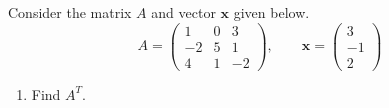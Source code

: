 \documentclass[12pt,letterpaper]{exam}
\begin{document}
\begin{questions}
\newpage
\question[15] Consider the matrix $A$ and vector $\mathbf{x}$ given below.
	\[
	A= \begin{pmatrix} 1 & 0 & 3 \\ -2 & 5 & 1 \\ 4 & 1 & -2 \end{pmatrix}, \qquad \mathbf{x}= \begin{pmatrix} 3 \\ -1 \\ 2 \end{pmatrix}
	\]

\begin{enumerate}
\item[(a)] Find $A^T$. \par\vspace{0.3cm}
\wsol{%
	\[
	A^T= \boxed{\begin{pmatrix} 1 & -2 & 4 \\ 0 & 5 & 1 \\ 3 & 1 & -2 \end{pmatrix}}
	\]%
} \vfill


\end{enumerate}
\end{questions}
\end{document}
